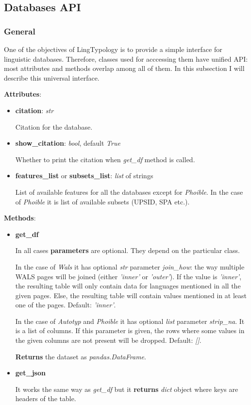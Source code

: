 \documentclass[a4paper,12pt]{article}
\begin{document}
\subsection{Databases API}

\subsubsection{General}

One of the objectives of LingTypology is to provide a simple interface for linguistic databases. Therefore, classes used for acccessing them have unified API: most attributes and methods overlap among all of them. In this subsection I will describe this universal interface.

\textbf{Attributes}:
\begin{itemize}
 \item \textbf{citation}: \textit{str}
 
 Citation for the database.
 
 \item \textbf{show\_citation}: \textit{bool}, default \textit{True}
 
 Whether to print the citation when \textit{get\_df} method is called.
 
 \item \textbf{features\_list} or \textbf{subsets\_list}: \textit{list} of strings
 
 List of available features for all the databases except for \textit{Phoible}. In the case of \textit{Phoible} it is list of available subsets (UPSID, SPA etc.).
\end{itemize}


\textbf{Methods}:
\begin{itemize}
 \item \textbf{get\_df}
 
 In all cases \textbf{parameters} are optional. They depend on the particular class.
 
 In the case of \textit{Wals} it has optional \textit{str} parameter \textit{join\_how}: the way multiple WALS pages will be joined (either \textit{'inner'} or \textit{'outer'}). If the value is \textit{'inner'}, the resulting table will only contain data for languages mentioned in all the given pages. Else, the resulting table will contain values mentioned in at least one of the pages. Default: \textit{'inner'}.
 
 In the case of \textit{Autotyp} and \textit{Phoible} it has optional \textit{list} parameter \textit{strip\_na}. It is a list of columns. If this parameter is given, the rows where some values in the given columns are not present will be dropped. Default: \textit{[]}.
 
 \textbf{Returns} the dataset as \textit{pandas.DataFrame}.
 
 \item \textbf{get\_json}
 
 It works the same way as \textit{get\_df} but it \textbf{returns} \textit{dict} object where keys are headers of the table.
 
\end{itemize}
\end{document}
